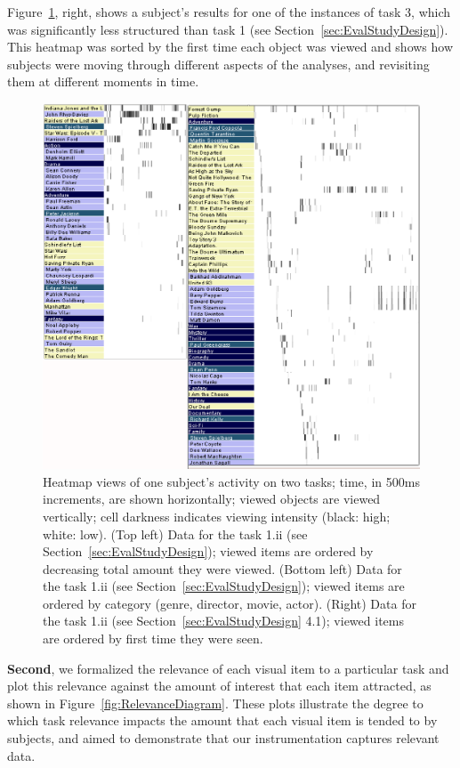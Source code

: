 Figure~\ref{fig:heatmap}, right, shows a subject's results for one of the instances of task 3, which was significantly less structured than task 1 (see Section~\ref{sec:EvalStudyDesign}). This heatmap  was sorted by the first time each object was viewed and shows how subjects were moving through different aspects of the analyses, and revisiting them at different moments in time. 

\begin{figure}[!ht]
  \centering
  \includegraphics[width=0.75\linewidth]{images/heatmaps.eps}
  \caption{Heatmap views of one subject's activity on two tasks; time, in 500ms increments, are shown horizontally; viewed objects are viewed vertically; cell darkness indicates viewing intensity (black: high; white: low). (Top left) Data for the task 1.ii (see Section~\ref{sec:EvalStudyDesign}); viewed items are ordered by decreasing total amount they were viewed. (Bottom left) Data for the task 1.ii (see Section~\ref{sec:EvalStudyDesign}); viewed items are ordered by category (genre, director, movie, actor). (Right) Data for the task 1.ii (see Section~\ref{sec:EvalStudyDesign} 4.1); viewed items are ordered by first time they were seen. 
}
	\label{fig:heatmap}
\end{figure}


\textbf{Second}, we formalized the relevance of each visual item to a particular task and plot this relevance against the amount of interest that each item attracted, as shown in Figure~\ref{fig:RelevanceDiagram}. These plots illustrate the degree to which task relevance impacts the amount that each visual item is tended to by subjects, and aimed to demonstrate that our instrumentation captures relevant data.  


